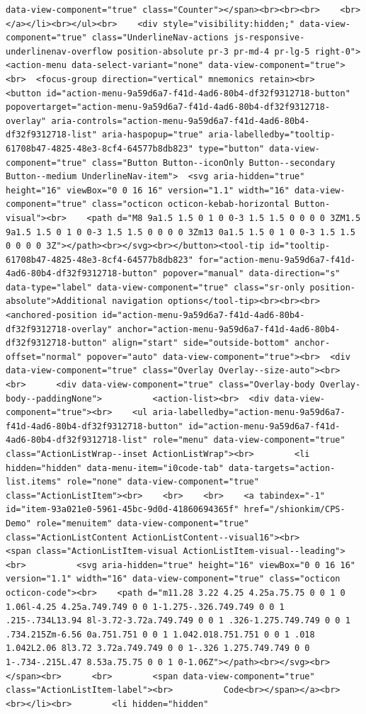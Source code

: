 \documentclass[
  letterpaper,
]{book}
\begin{document}
\begin{verbatim}
data-view-component="true" class="Counter"></span><br><br><br>    <br></a></li><br></ul><br>    <div style="visibility:hidden;" data-view-component="true" class="UnderlineNav-actions js-responsive-underlinenav-overflow position-absolute pr-3 pr-md-4 pr-lg-5 right-0">      <action-menu data-select-variant="none" data-view-component="true"><br>  <focus-group direction="vertical" mnemonics retain><br>    <button id="action-menu-9a59d6a7-f41d-4ad6-80b4-df32f9312718-button" popovertarget="action-menu-9a59d6a7-f41d-4ad6-80b4-df32f9312718-overlay" aria-controls="action-menu-9a59d6a7-f41d-4ad6-80b4-df32f9312718-list" aria-haspopup="true" aria-labelledby="tooltip-61708b47-4825-48e3-8cf4-64577b8db823" type="button" data-view-component="true" class="Button Button--iconOnly Button--secondary Button--medium UnderlineNav-item">  <svg aria-hidden="true" height="16" viewBox="0 0 16 16" version="1.1" width="16" data-view-component="true" class="octicon octicon-kebab-horizontal Button-visual"><br>    <path d="M8 9a1.5 1.5 0 1 0 0-3 1.5 1.5 0 0 0 0 3ZM1.5 9a1.5 1.5 0 1 0 0-3 1.5 1.5 0 0 0 0 3Zm13 0a1.5 1.5 0 1 0 0-3 1.5 1.5 0 0 0 0 3Z"></path><br></svg><br></button><tool-tip id="tooltip-61708b47-4825-48e3-8cf4-64577b8db823" for="action-menu-9a59d6a7-f41d-4ad6-80b4-df32f9312718-button" popover="manual" data-direction="s" data-type="label" data-view-component="true" class="sr-only position-absolute">Additional navigation options</tool-tip><br><br><br><anchored-position id="action-menu-9a59d6a7-f41d-4ad6-80b4-df32f9312718-overlay" anchor="action-menu-9a59d6a7-f41d-4ad6-80b4-df32f9312718-button" align="start" side="outside-bottom" anchor-offset="normal" popover="auto" data-view-component="true"><br>  <div data-view-component="true" class="Overlay Overlay--size-auto"><br>    <br>      <div data-view-component="true" class="Overlay-body Overlay-body--paddingNone">          <action-list><br>  <div data-view-component="true"><br>    <ul aria-labelledby="action-menu-9a59d6a7-f41d-4ad6-80b4-df32f9312718-button" id="action-menu-9a59d6a7-f41d-4ad6-80b4-df32f9312718-list" role="menu" data-view-component="true" class="ActionListWrap--inset ActionListWrap"><br>        <li hidden="hidden" data-menu-item="i0code-tab" data-targets="action-list.items" role="none" data-view-component="true" class="ActionListItem"><br>    <br>    <br>    <a tabindex="-1" id="item-93a021e0-5961-45bc-9d0d-41860694365f" href="/shionkim/CPS-Demo" role="menuitem" data-view-component="true" class="ActionListContent ActionListContent--visual16"><br>        <span class="ActionListItem-visual ActionListItem-visual--leading"><br>          <svg aria-hidden="true" height="16" viewBox="0 0 16 16" version="1.1" width="16" data-view-component="true" class="octicon octicon-code"><br>    <path d="m11.28 3.22 4.25 4.25a.75.75 0 0 1 0 1.06l-4.25 4.25a.749.749 0 0 1-1.275-.326.749.749 0 0 1 .215-.734L13.94 8l-3.72-3.72a.749.749 0 0 1 .326-1.275.749.749 0 0 1 .734.215Zm-6.56 0a.751.751 0 0 1 1.042.018.751.751 0 0 1 .018 1.042L2.06 8l3.72 3.72a.749.749 0 0 1-.326 1.275.749.749 0 0 1-.734-.215L.47 8.53a.75.75 0 0 1 0-1.06Z"></path><br></svg><br>        </span><br>      <br>        <span data-view-component="true" class="ActionListItem-label"><br>          Code<br></span></a><br>  <br></li><br>        <li hidden="hidden" 
\end{verbatim}
\end{document}
